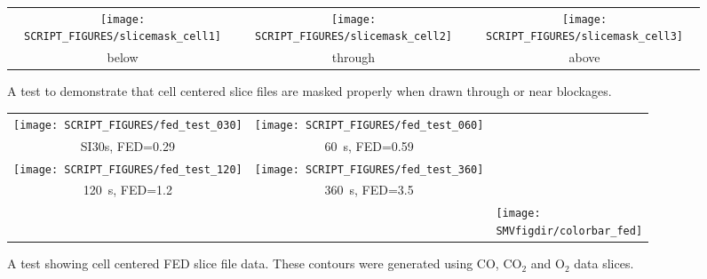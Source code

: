 \documentclass[11pt,twoside]{book}
\begin{document}
\begin{figure}[bph]
\begin{center}
\begin{tabular}{ccc}
 \texttt{[image: SCRIPT\_FIGURES/slicemask\_cell1]}&
 \texttt{[image: SCRIPT\_FIGURES/slicemask\_cell2]}&
 \texttt{[image: SCRIPT\_FIGURES/slicemask\_cell3]}\\
 below&through&above
\end{tabular}
\end{center}
 \caption[A test to demonstrate that cell centered slice files are masked properly.]
 {A test to demonstrate that cell centered slice files are masked properly when drawn through or near blockages.}
\label{figslicecellmasktest}%
\end{figure}

\begin{figure}[bph]
\begin{center}
\begin{tabular}{ccp{1.0in}}
 \texttt{[image: SCRIPT\_FIGURES/fed\_test\_030]}&
 \texttt{[image: SCRIPT\_FIGURES/fed\_test\_060]}\\
SI{30}{s}, FED=0.29&\SI{60}{s}, FED=0.59\\
 \texttt{[image: SCRIPT\_FIGURES/fed\_test\_120]}&
 \texttt{[image: SCRIPT\_FIGURES/fed\_test\_360]}\\
\SI{120}{s}, FED=1.2&3\SI{60}{s}, FED=3.5\\
&&\raisebox{0.25in}[0pt]{\texttt{[image: \\SMVfigdir/colorbar\_fed]}}
 \end{tabular}
\end{center}
 \caption[A test showing cell centered FED slice file data]{A test showing cell
 centered FED slice file data.  These contours were generated using $\mathrm{CO}$,
 $\mathrm{CO_2}$ and $\mathrm{O_2}$ data slices. }
\label{figfedslicetest}%
\end{figure}
\end{document}
